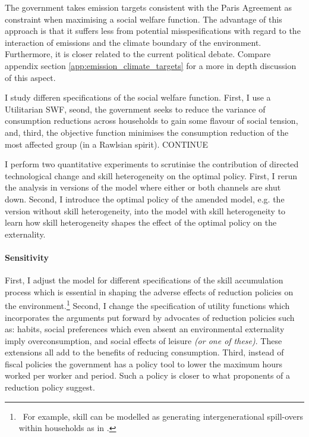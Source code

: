 The government takes  emission targets consistent with the Paris Agreement as constraint when maximising a social welfare function.  The advantage of this approach is that it suffers less from potential misspesifications with regard to the interaction of emissions and the climate boundary of the environment. Furthermore, it is closer related to the current political debate. Compare appendix section \ref{app:emission_climate_targets} for a more in depth discussion of this aspect.  

I study differen specifications of the social welfare function. First, I use a Utilitarian SWF, seond,  the government seeks to reduce the variance of consumption reductions across households to gain some flavour of social tension, and, third, the objective function minimises the consumption reduction of the most affected group (in a Rawlsian spirit). CONTINUE

I perform two quantitative experiments to scrutinise the contribution of directed technological change and skill heterogeneity on the optimal policy. First, I rerun the analysis in versions of the model where either or both channels are shut down.  Second, I introduce the optimal policy of the amended model, e.g. the  version without skill heterogeneity, into the model with skill heterogeneity to learn how skill heterogeneity shapes the effect of the optimal policy on the externality.

\paragraph{Sensitivity}
First, I adjust the model for different specifications of the skill accumulation process which is essential in shaping the adverse effects of reduction policies on the environment.\footnote{\ For example, skill can be modelled as generating intergenerational spill-overs within households as in \cite{Borissov2019CarbonDevelopment}.} Second, I change the specification of utility functions which incorporates the arguments put forward by advocates of reduction policies such as: habits, social preferences which even absent an environmental externality imply overconsumption, and social effects of leisure \textit{(or one of these)}.  These extensions all add to the benefits of reducing consumption. Third, instead of fiscal policies the government has a policy tool to lower the maximum hours worked per worker and period. Such a policy is closer to what proponents of a reduction policy suggest. %

